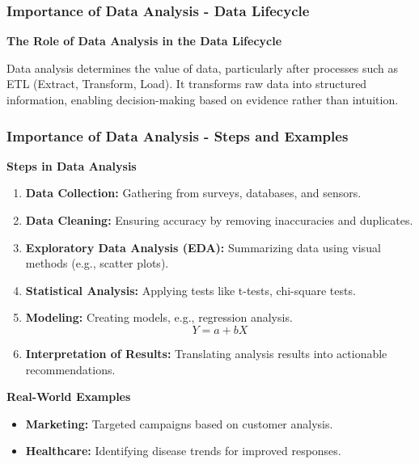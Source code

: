 \documentclass[aspectratio=169]{beamer}
\begin{document}
\begin{frame}[fragile]
    \frametitle{Importance of Data Analysis - Data Lifecycle}
    
    \textbf{The Role of Data Analysis in the Data Lifecycle}
    
    Data analysis determines the value of data, particularly after processes such as ETL (Extract, Transform, Load). It transforms raw data into structured information, enabling decision-making based on evidence rather than intuition.
\end{frame}

\begin{frame}[fragile]
    \frametitle{Importance of Data Analysis - Steps and Examples}
    
    \textbf{Steps in Data Analysis}
    
    \begin{enumerate}
        \item \textbf{Data Collection:} Gathering from surveys, databases, and sensors.
        \item \textbf{Data Cleaning:} Ensuring accuracy by removing inaccuracies and duplicates.
        \item \textbf{Exploratory Data Analysis (EDA):} Summarizing data using visual methods (e.g., scatter plots).
        \item \textbf{Statistical Analysis:} Applying tests like t-tests, chi-square tests.
        \item \textbf{Modeling:} Creating models, e.g., regression analysis.
        \begin{equation}
            Y = a + bX
        \end{equation}
        \item \textbf{Interpretation of Results:} Translating analysis results into actionable recommendations.
    \end{enumerate}
    
    \textbf{Real-World Examples}
    \begin{itemize}
        \item \textbf{Marketing:} Targeted campaigns based on customer analysis.
        \item \textbf{Healthcare:} Identifying disease trends for improved responses.
    \end{itemize}
\end{frame}
\end{document}
